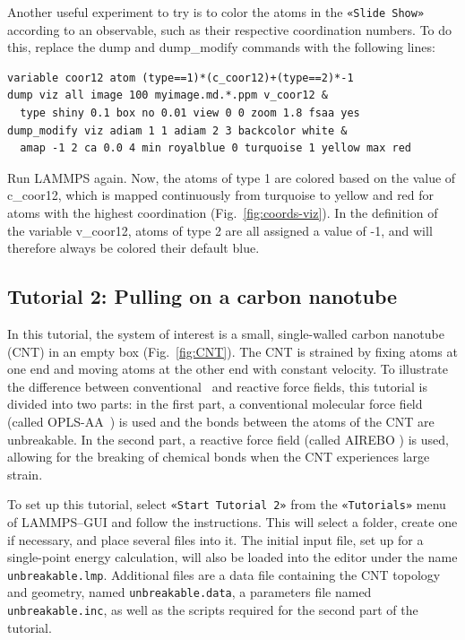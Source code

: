 \documentclass[9pt,tutorial]{livecoms}
\newcommand{\lmpcmd}[1]{\hspace{0pt}\colorbox{listing}{\textcolor{command}{\small{#1}}}\hspace{0pt}} %
\newcommand{\flecmd}[1]{\textcolor{command}{\texttt{#1}}} %
\newcommand{\guicmd}[1]{\textcolor{command}{\texttt{«#1»}}} %
\begin{document}
Another useful experiment to try is to color the atoms in the \guicmd{Slide Show}
according to an observable, such as their respective coordination
numbers.  To do this, replace the
\lmpcmd{dump} and \lmpcmd{dump\_modify} commands with the following lines:
\begin{lstlisting}
variable coor12 atom (type==1)*(c_coor12)+(type==2)*-1
dump viz all image 100 myimage.md.*.ppm v_coor12 &
  type shiny 0.1 box no 0.01 view 0 0 zoom 1.8 fsaa yes
dump_modify viz adiam 1 1 adiam 2 3 backcolor white &
  amap -1 2 ca 0.0 4 min royalblue 0 turquoise 1 yellow max red
\end{lstlisting}
Run LAMMPS again.  Now, the atoms of type 1 are colored based on the value
of \lmpcmd{c\_coor12}, which is mapped continuously from turquoise to yellow
and red for atoms with the highest coordination (Fig.~\ref{fig:coords-viz}).
In the definition of the variable \lmpcmd{v\_coor12}, atoms of type 2 are
all assigned a value of -1, and will therefore always be colored their default blue.

\subsection{Tutorial 2: Pulling on a carbon nanotube}
\label{carbon-nanotube-label}

In this tutorial, the system of interest is a small, single-walled
carbon nanotube (CNT) in an empty box (Fig.~\ref{fig:CNT}).  The CNT is
strained by fixing atoms at one end and moving atoms at the
other end with constant velocity.  To illustrate the difference between
conventional~\cite{typelabel_paper} and reactive force fields, this
tutorial is divided into two parts: in the first part, a conventional molecular force
field (called OPLS-AA~\cite{jorgensenDevelopmentTestingOPLS1996}) is
used and the bonds between the atoms of the CNT are unbreakable.  In the
second part, a reactive force field (called AIREBO
\cite{stuart2000reactive}) is used, allowing for the breaking of
chemical bonds when the CNT experiences large strain.

To set up this tutorial, select \guicmd{Start Tutorial 2} from the
\guicmd{Tutorials} menu of LAMMPS--GUI and follow the instructions.  This will
select a folder, create one if necessary, and place several files into it.
The initial input file, set up for a single-point energy
calculation, will also be loaded into the editor under the name
\flecmd{unbreakable.lmp}.  Additional files are a data file containing the
CNT topology and geometry, named \flecmd{unbreakable.data}, a parameters file
named \flecmd{unbreakable.inc}, as well as the scripts required for the second part
of the tutorial.
\end{document}
